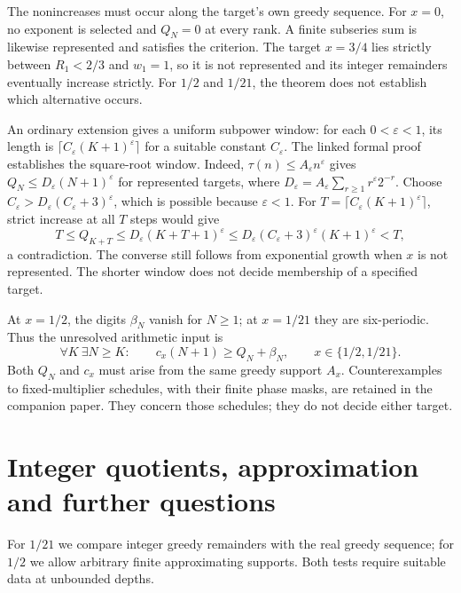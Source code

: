 \documentclass[11pt]{article}
\begin{document}
The nonincreases must occur along the target's own greedy sequence.
For $x=0$, no exponent is selected and $Q_N=0$ at every rank.  A finite subseries sum is likewise represented and satisfies the
criterion.  The target $x=3/4$ lies strictly between $R_1<2/3$ and
$w_1=1$, so it is not represented and its integer remainders eventually
increase strictly.  For $1/2$ and $1/21$, the theorem does not establish
which alternative occurs.

An ordinary extension gives a uniform subpower window: for each
$0<\varepsilon<1$, its length is
$\lceil C_\varepsilon(K+1)^\varepsilon\rceil$ for a suitable constant
$C_\varepsilon$. The linked formal proof establishes the square-root window.
Indeed, $\tau(n)\le A_\varepsilon n^\varepsilon$ gives
$Q_N\le D_\varepsilon(N+1)^\varepsilon$ for represented targets,
where $D_\varepsilon=A_\varepsilon\sum_{r\ge1}r^\varepsilon2^{-r}$.
Choose $C_\varepsilon>D_\varepsilon(C_\varepsilon+3)^\varepsilon$,
which is possible because $\varepsilon<1$.
For $T=\lceil C_\varepsilon(K+1)^\varepsilon\rceil$, strict increase
at all $T$ steps would give
\[
 T\le Q_{K+T}\le D_\varepsilon(K+T+1)^\varepsilon
 \le D_\varepsilon(C_\varepsilon+3)^\varepsilon(K+1)^\varepsilon<T,
\]
a contradiction. The converse still follows from exponential growth
when $x$ is not represented. The shorter window does not decide
membership of a specified target.

At $x=1/2$, the digits $\beta_N$ vanish for $N\ge1$; at $x=1/21$ they
are six-periodic.  Thus the unresolved arithmetic input is
\begin{equation}
 \forall K\ \exists N\ge K:\qquad
 c_x(N+1)\ge Q_N+\beta_N,
 \qquad x\in\{1/2,1/21\}.
 \label{eq:actual-selector-obligation}
\end{equation}
Both $Q_N$ and $c_x$ must arise from the same greedy support $A_x$.
Counterexamples to fixed-multiplier schedules, with their finite phase
masks, are retained in the companion paper. They concern those schedules;
they do not decide either target.

\section{Integer quotients, approximation and further questions}\label{sec:open}
For $1/21$ we compare integer greedy remainders with the real greedy
sequence; for $1/2$ we allow arbitrary finite approximating supports.
Both tests require suitable data at unbounded depths.
\end{document}
